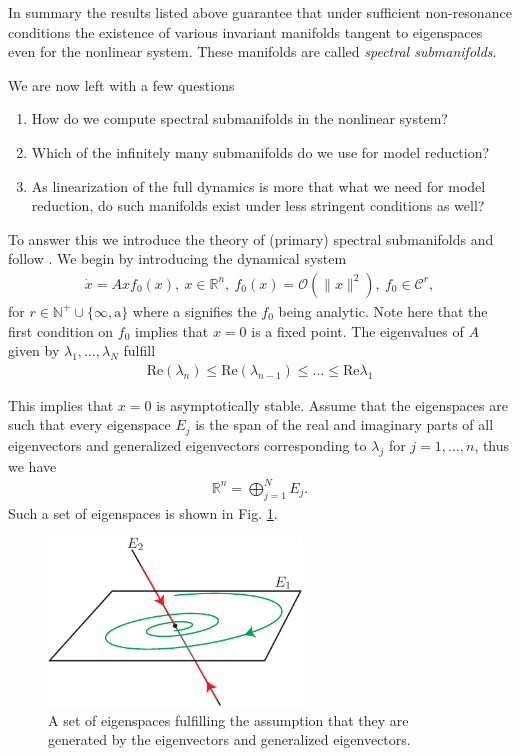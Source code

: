 In summary the results listed above guarantee that under sufficient non-resonance conditions the existence of various invariant manifolds tangent to eigenspaces even for the nonlinear system. These manifolds are called \emph{spectral submanifolds}.

We are now left with a few questions
\begin{enumerate}
	\item How do we compute spectral submanifolds in the nonlinear system?
	\item Which of the infinitely many submanifolds do we use for model reduction?
	\item As linearization of the full dynamics is more that what we need for model reduction, do such manifolds exist under less stringent conditions as well?
\end{enumerate}

To answer this we introduce the theory of (primary) spectral submanifolds and follow \cite{Ponsioen2016}. We begin by introducing the dynamical system
\begin{align}
	\dot{x} = Ax f_0(x),\ x \in \mathbb{R}^{n},\ f_{0}(x)=\mathcal{O}\left(\|x\|^2\right),\ f_0 \in \mathcal{C}^{r},
\end{align}
for $r \in \mathbb{N}^{+}\cup\{\infty , \textrm{a} \}$ where a signifies the $f_0$ being analytic. Note here that the first condition on $f_0$ implies that $x=0$ is a fixed point. The eigenvalues of $A$ given by $\lambda_1,\ldots,\lambda_N$ fulfill
\begin{align}
	\textrm{Re} (\lambda_n) \leq  \textrm{Re} (\lambda_{n-1}) \leq \ldots \leq  \textrm{Re} \lambda_1 	
\end{align}

This implies that $x=0$ is asymptotically stable. Assume that the eigenspaces are such that every eigenspace $E_j$ is the span of the real and imaginary parts of all eigenvectors and generalized eigenvectors corresponding to $\lambda_j$ for $j=1,\ldots,n$, thus we have
\begin{align}
\mathbb{R}^{n} = \bigoplus_{j=1}^{N}E_j	.
\end{align}
Such a set of eigenspaces is shown in Fig. \ref{fig:ponsioen_eigenspaces}.
\begin{figure}[h!]
	\centering
	\includegraphics[width=0.6\textwidth]{figures/ch9/30ponsioen_eigenspaces.pdf}
	\caption{A set of eigenspaces fulfilling the assumption that they are generated by the eigenvectors and generalized eigenvectors.}
	\label{fig:ponsioen_eigenspaces}
\end{figure}

